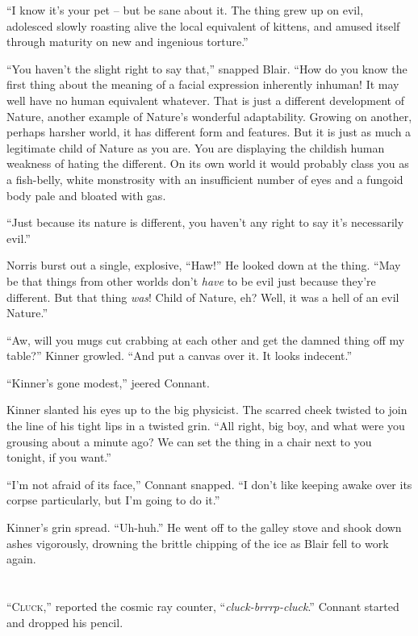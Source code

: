\documentclass[ebook,oneside,11pt]{memoir}				%
\begin{document}
``I know it's your pet -- but be sane about it. The thing grew up on evil, adolesced slowly roasting alive the local equivalent of kittens, and amused itself through maturity on new and ingenious torture.''

``You haven't the slight right to say that,'' snapped Blair. ``How do you know the first thing about the meaning of a facial expression inherently inhuman! It may well have no human equivalent whatever. That is just a different development of Nature, another example of Nature's wonderful adaptability. Growing on another, perhaps harsher world, it has different form and features. But it is just as much a legitimate child of Nature as you are. You are displaying the childish human weakness of hating the different. On its own world it would probably class you as a fish-belly, white monstrosity with an insufficient number of eyes and a fungoid body pale and bloated with gas.

``Just because its nature is different, you haven't any right to say it's necessarily evil.''

Norris burst out a single, explosive, ``Haw!'' He looked down at the thing. ``May be that things from other worlds don't \emph{have} to be evil just because they're different. But that thing \emph{was}! Child of Nature, eh? Well, it was a hell of an evil Nature.''

``Aw, will you mugs cut crabbing at each other and get the damned thing off my table?'' Kinner growled. ``And put a canvas over it. It looks indecent.''

``Kinner's gone modest,'' jeered Connant.

Kinner slanted his eyes up to the big physicist. The scarred cheek twisted to join the line of his tight lips in a twisted grin. ``All right, big boy, and what were you grousing about a minute ago? We can set the thing in a chair next to you tonight, if you want.''

``I'm not afraid of its face,'' Connant snapped. ``I don't like keeping awake over its corpse particularly, but I'm going to do it.''

Kinner's grin spread. ``Uh-huh.'' He went off to the galley stove and shook down ashes vigorously, drowning the brittle chipping of the ice as Blair fell to work again.

\chapter[Chapter 4]{}
\lettrine[lines=3,findent=3pt,nindent=2pt]{``C}{luck},'' reported the cosmic ray counter, ``\emph{cluck-brrrp-cluck}.'' Connant started and dropped his pencil.\\
\end{document}
